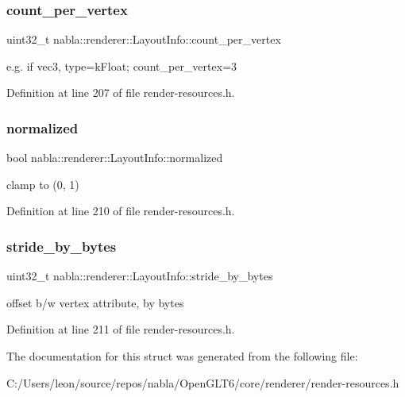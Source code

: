 \subsubsection{\texorpdfstring{count\_per\_vertex}{count\_per\_vertex}}
{\footnotesize\ttfamily uint32\+\_\+t nabla\+::renderer\+::\+Layout\+Info\+::count\+\_\+per\+\_\+vertex}

e.\+g. if vec3, {\ttfamily type=k\+Float; count\+\_\+per\+\_\+vertex=3} 

Definition at line 207 of file render-\/resources.\+h.

\mbox{\label{structnabla_1_1renderer_1_1_layout_info_ae029150fe1e95759d847a7e9cb6ce57e}} 
\subsubsection{\texorpdfstring{normalized}{normalized}}
{\footnotesize\ttfamily bool nabla\+::renderer\+::\+Layout\+Info\+::normalized}

clamp to (0, 1) 

Definition at line 210 of file render-\/resources.\+h.

\mbox{\label{structnabla_1_1renderer_1_1_layout_info_ac790cb5c58e554cb3b9ec216c4081cfc}} 
\subsubsection{\texorpdfstring{stride\_by\_bytes}{stride\_by\_bytes}}
{\footnotesize\ttfamily uint32\+\_\+t nabla\+::renderer\+::\+Layout\+Info\+::stride\+\_\+by\+\_\+bytes}

offset b/w vertex attribute, by bytes 

Definition at line 211 of file render-\/resources.\+h.



The documentation for this struct was generated from the following file\+:\begin{DoxyCompactItemize}
\item 
C\+:/\+Users/leon/source/repos/nabla/\+Open\+G\+L\+T6/core/renderer/render-\/resources.\+h\end{DoxyCompactItemize}
